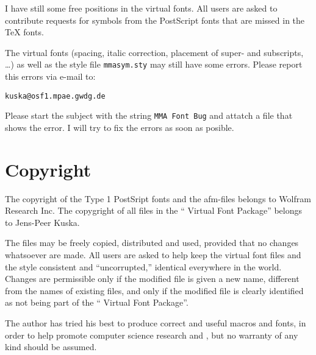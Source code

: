 \documentclass{article}
\begin{document}
I have still some free positions in the virtual fonts. All users
are asked to contribute requests for symbols from the PostScript
fonts that are missed in the \TeX{} fonts. 

The virtual fonts (spacing, italic correction, placement of super- and
subscripts, \ldots) as well as the style file \texttt{mmasym.sty} may
still have some errors. Please report this errors via e-mail to:

\begin{verbatim}
kuska@osf1.mpae.gwdg.de
\end{verbatim}

Please start the subject with the string \verb|MMA Font Bug| and attatch
a \LaTeXe{} file that shows the error. I will try to fix the errors
as soon as posible.

\section{Copyright}

The copyright of the Type 1 PostSript fonts and the
afm-files belongs to Wolfram Research Inc. The copygright of
all files in the ``\MathLogo{} Virtual Font Package'' belongs
to Jens-Peer Kuska.

The files may be freely copied, distributed and used, 
provided that no changes whatsoever are made. 
All users are asked to help keep the virtual font files 
and the style consistent and ``uncorrupted,''
identical everywhere in the world. 
Changes are permissible only
if the modified file is given a new name, 
different from the names of existing files, 
and only if the modified file is clearly 
identified as not being part of the ``\MathLogo{} 
Virtual Font Package''.
    
The author has tried his best to produce correct 
and useful macros and fonts, in order to 
help promote computer science research and
\MathLogo, but no warranty of any kind should 
be assumed.
\end{document}
